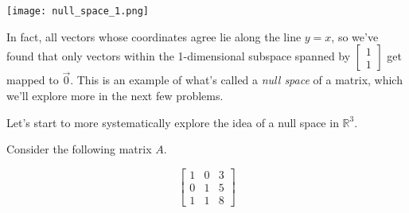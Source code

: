 \documentclass{ximera}
\begin{document}
\begin{exploration}
\begin{solution}
        \begin{center}
            \texttt{[image: null\_space\_1.png]}
        \end{center}
    
        In fact, all vectors whose coordinates agree lie along the line $y=x$, so we've found that only vectors within the 1-dimensional subspace spanned by $\begin{bmatrix} 1 \\ 1 \end{bmatrix}$ get mapped to $\vec{0}$. This is an example of what's called a \emph{null space} of a matrix, which we'll explore more in the next few problems.

    \end{solution}

\end{exploration}

Let's start to more systematically explore the idea of a null space in $\mathbb{R}^3$.

Consider the following matrix $A$. 

$$ 
\left[
\begin{matrix}
    1 & 0 & 3  \\
    0 & 1 & 5  \\
    1 & 1 & 8 
\end{matrix}
\right] 
$$
\end{document}
